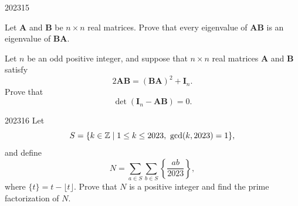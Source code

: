 \begin{problem}{2023}{1}{5}
\begin{problemsubparts}
    \item Let $\mathbf A$ and $\mathbf B$ be $n\times n$ real matrices. Prove that every eigenvalue of $\mathbf A\mathbf B$ is an eigenvalue of $\mathbf B\mathbf A$.
    \item Let $n$ be an odd positive integer, and suppose that $n\times n$ real matrices $\mathbf A$ and $\mathbf B$ satisfy
    \[
        2\mathbf A\mathbf B=(\mathbf B\mathbf A)^2+\mathbf I_n.
    \]
    Prove that
    \[
        \det(\mathbf I_n-\mathbf A\mathbf B)=0.
    \]
\end{problemsubparts}
\end{problem}

\begin{problem}{2023}{1}{6}
Let
\[
    S=\{k\in\mathbb{Z}\mid 1\le k\le2023, \ \gcd(k, 2023)=1\},
\]
and define
\[
    N=
    \sum_{a\in S}\sum_{b\in S}
    \left\{\frac{ab}{2023}\right\},
\]
where $\{t\}=t-\lfloor t\rfloor$. Prove that $N$ is a positive integer and find the prime factorization of $N$.
\end{problem}
